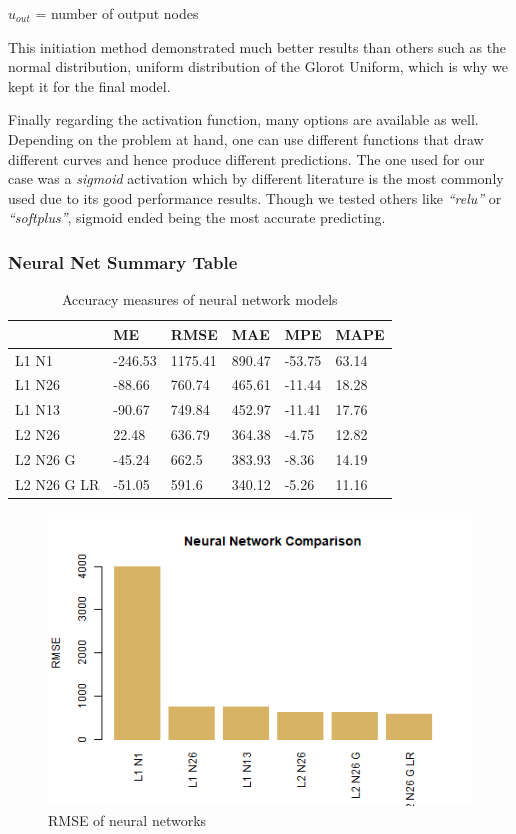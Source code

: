 \documentclass[
  paper=a4,
  ,captions=tableheading
]{scrartcl}
\begin{document}
\(u_{out}\) = number of output nodes

This initiation method demonstrated much better results than others such
as the normal distribution, uniform distribution of the Glorot Uniform,
which is why we kept it for the final model.

Finally regarding the activation function, many options are available as
well. Depending on the problem at hand, one can use different functions
that draw different curves and hence produce different predictions. The
one used for our case was a \emph{sigmoid} activation which by different
literature is the most commonly used due to its good performance
results. Though we tested others like \emph{``relu''} or
\emph{``softplus''}, sigmoid ended being the most accurate predicting.

\hypertarget{neural-net-summary-table}{%
\subsubsection{Neural Net Summary
Table}\label{neural-net-summary-table}}

\begin{table}[!h]

\caption{\label{tab:NN Summary}Accuracy measures of neural network models}
\centering
\begin{tabu} to 
\hline
  & ME & RMSE & MAE & MPE & MAPE\\
\hline
L1 N1 & -246.53 & 1175.41 & 890.47 & -53.75 & 63.14\\
\hline
L1 N26 & -88.66 & 760.74 & 465.61 & -11.44 & 18.28\\
\hline
L1 N13 & -90.67 & 749.84 & 452.97 & -11.41 & 17.76\\
\hline
L2 N26 & 22.48 & 636.79 & 364.38 & -4.75 & 12.82\\
\hline
L2 N26 G & -45.24 & 662.5 & 383.93 & -8.36 & 14.19\\
\hline
L2 N26 G LR & -51.05 & 591.6 & 340.12 & -5.26 & 11.16\\
\hline
\end{tabu}
\end{table}

\begin{figure}[H]

{\centering \includegraphics[width=0.5\linewidth,]{Diamonds_PDF_files/figure-latex/NN Summary-1}

}

\caption{RMSE of neural networks}\label{fig:NN Summary}
\end{figure}
\end{document}
